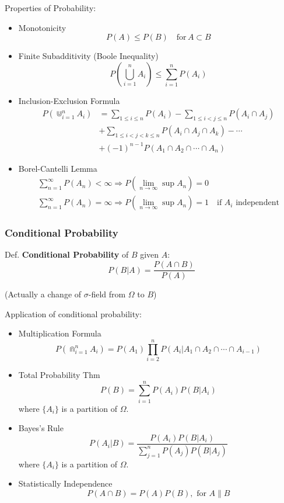 \documentclass[11pt,a4paper]{ctexart}
\numberwithin{equation}{section}%
\begin{document}
    Properties of Probability:
    \begin{itemize}
        \item Monotonicity
        \[
            P(A)\leq P(B)\quad \text{for}\, A\subset B
        \]
        \item Finite Subadditivity (Boole Inequality)
        \[
            P(\bigcup_{i=1}^nA_i)\leq\sum_{i=1}^n P(A_i)    
        \]
        \item Inclusion-Exclusion Formula
        \begin{align*}
            P(\Cup_{i=1}^nA_i)&=\sum_{1\leq i\leq n}P(A_i)-\sum_{1\leq i<j\leq n}P(A_i\cap A_j)\\
            &+\sum_{1\leq i<j<k\leq n}P(A_i\cap A_j\cap A_k)-\cdots\\
            &+(-1)^{n-1}P(A_1 \cap A_2\cap\cdots \cap A_n)
        \end{align*}
        \item Borel-Cantelli Lemma
        \begin{gather*}
            \sum_{n=1}^\infty P(A_n)<\infty\Rightarrow P(\lim_{n\to\infty}\sup A_n)=0\\
            \sum_{n=1}^\infty P(A_n)=\infty\Rightarrow P(\lim_{n\to\infty}\sup A_n)=1\quad \text{if }A_i\text{ independent}
        \end{gather*}
    \end{itemize}


\subsubsection{Conditional Probability}
        Def. \textbf{Conditional Probability} of $B$ given $A$:
        \[
            P(B|A)=\frac{P(A\cap B)}{P(A)}    
        \]

        (Actually a change of $\sigma$-field from $\Omega$ to $B$)

        Application of conditional probability:
        \begin{itemize}
        \item Multiplication Formula
        \[
            P(\Cap_{i=1}^n A_i)=P(A_1)\prod_{i=2}^n P(A_i|A_1\cap A_2\cap \cdots\cap A_{i-1})    
        \]
        \item Total Probability Thm
        \[
            P(B)=\sum_{i=1}^n P(A_i)P(B|A_i)  
        \]
        where $\{A_i\}$ is a partition of $\Omega$.
        \item Bayes's Rule
        \[
            P(A_i|B)=\frac{P(A_i)P(B|A_i)}{\sum_{j=1}^nP(A_j)P(B|A_j)}    
        \]
        where $\{A_i\}$ is a partition of $\Omega$.
        \item Statistically Independence
        \[
            P(A\cap B) =P(A)P(B),\text{ for }A\parallel B
        \]
    \end{itemize}
\end{document}
